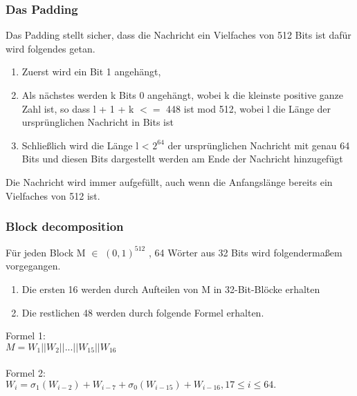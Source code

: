{\subsubsection{Das Padding}
\label{sec:hash_padd}
Das Padding stellt sicher, dass die Nachricht ein Vielfaches von 512 Bits ist dafür wird folgendes getan.
\begin{enumerate}
\item Zuerst wird ein Bit 1 angehängt,
\item Als nächstes werden k Bits 0 angehängt, wobei k die kleinste positive ganze Zahl ist, so dass l + 1 + k $<=$ 448 ist
mod 512, wobei l die Länge der ursprünglichen Nachricht in Bits ist
\item Schließlich wird die Länge l < $2^{64}$ der ursprünglichen Nachricht mit genau 64 Bits und diesen Bits dargestellt
werden am Ende der Nachricht hinzugefügt
\end{enumerate}
Die Nachricht wird immer aufgefüllt, auch wenn die Anfangslänge bereits ein Vielfaches von 512 ist.
\subsubsection{Block decomposition}
\label{sec:hash_block_deco}
Für jeden Block M $\in$ $(0, 1)^{512}$ , 64 Wörter aus 32 Bits wird folgendermaßem vorgegangen. 
\begin{enumerate}
\item Die ersten 16 werden durch Aufteilen von M in 32-Bit-Blöcke erhalten
\item Die restlichen 48 werden durch folgende Formel erhalten.
\end{enumerate}
Formel 1:
\\
$M = W_1 || W_2 || ... || W_{15} || W_{16}$\\ \\
Formel 2:\\
$W_i = \sigma_1(W_{i-2}) + W_{i-7} + \sigma_0(W_{i-15}) + W_{i-16},
17 \leq  i \leq  64.$\\
}
